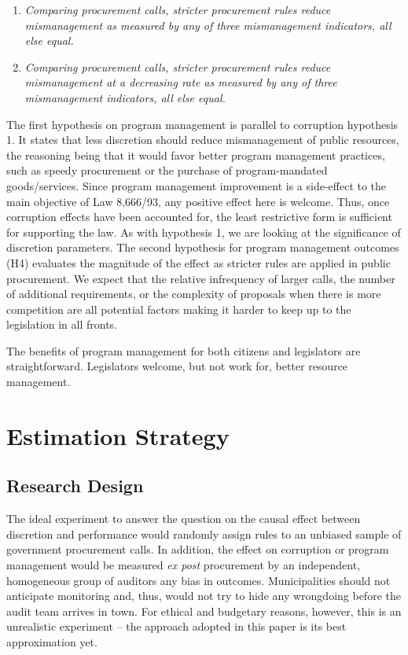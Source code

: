 \documentclass[11pt]{article}
\newcommand{\hypopen}{Comparing procurement calls}
\begin{document}
\begin{enumerate}[label = H\arabic{enumi}:, font = \bfseries, labelindent = \parindent, leftmargin = *, resume] %
  \item \textit{\hypopen, stricter procurement rules reduce mismanagement as measured by any of three mismanagement indicators, \emph{all else equal}.}
  \item \textit{\hypopen, stricter procurement rules reduce mismanagement at a decreasing rate as measured by any of three mismanagement indicators, \emph{all else equal}.}
\end{enumerate}

The first hypothesis on program management is parallel to corruption hypothesis 1. It states that less discretion should reduce mismanagement of public resources, the reasoning being that it would favor better program management practices, such as speedy procurement or the purchase of program-mandated goods/services. Since program management improvement is a side-effect to the main objective of Law 8,666/93, any positive effect here is welcome. Thus, once corruption effects have been accounted for, the least restrictive form is sufficient for supporting the law. As with hypothesis 1, we are looking at the significance of discretion parameters. The second hypothesis for program management outcomes (H4) evaluates the magnitude of the effect as stricter rules are applied in public procurement. We expect that the relative infrequency of larger calls, the number of additional requirements, or the complexity of proposals when there is more competition are all potential factors making it harder to keep up to the legislation in all fronts.

The benefits of program management for both citizens and legislators are straightforward. Legislators welcome, but not work for, better resource management.


\section{Estimation Strategy} \label{sec:methodology}

\subsection{Research Design} \label{subsec:methodology}

The ideal experiment to answer the question on the causal effect between discretion and performance would randomly assign rules to an unbiased sample of government procurement calls. In addition, the effect on corruption or program management would be measured \emph{ex post} procurement by an independent, homogeneous group of auditors any bias in outcomes. Municipalities should not anticipate monitoring and, thus, would not try to hide any wrongdoing before the audit team arrives in town. For ethical and budgetary reasons, however, this is an unrealistic experiment -- the approach  adopted in this paper is its best approximation yet.
\end{document}
